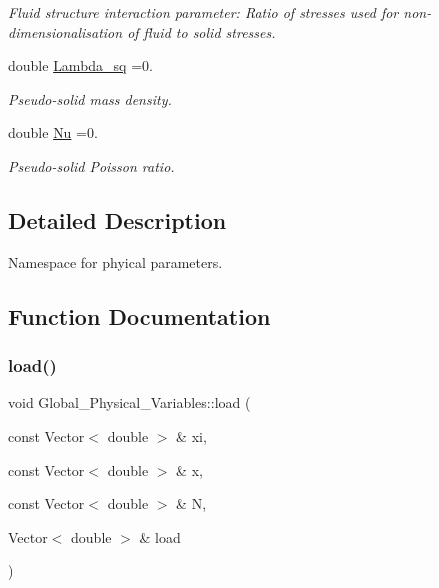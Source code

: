 \begin{DoxyCompactItemize}
\begin{DoxyCompactList}\small\item\em Fluid structure interaction parameter\+: Ratio of stresses used for non-\/dimensionalisation of fluid to solid stresses. \end{DoxyCompactList}\item 
double \hyperlink{namespaceGlobal__Physical__Variables_a6fe17557ceb32dd353827fba60408363}{Lambda\+\_\+sq} =0.
\begin{DoxyCompactList}\small\item\em Pseudo-\/solid mass density. \end{DoxyCompactList}\item 
double \hyperlink{namespaceGlobal__Physical__Variables_a3962c36313826b19f216f6bbbdd6a477}{Nu} =0.
\begin{DoxyCompactList}\small\item\em Pseudo-\/solid Poisson ratio. \end{DoxyCompactList}\end{DoxyCompactItemize}


\subsection{Detailed Description}
Namespace for phyical parameters. 

\subsection{Function Documentation}
\mbox{\label{namespaceGlobal__Physical__Variables_a321267e1efb30b5d586302509354fb07}} 
\subsubsection{\texorpdfstring{load()}{load()}}
{\footnotesize\ttfamily void Global\+\_\+\+Physical\+\_\+\+Variables\+::load (\begin{DoxyParamCaption}\item[{const Vector$<$ double $>$ \&}]{xi,  }\item[{const Vector$<$ double $>$ \&}]{x,  }\item[{const Vector$<$ double $>$ \&}]{N,  }\item[{Vector$<$ double $>$ \&}]{load }\end{DoxyParamCaption})}



